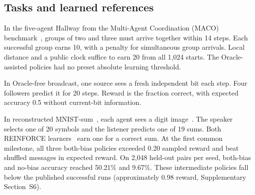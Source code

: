 \documentclass[pdflatex,sn-mathphys-num]{sn-jnl}
\begin{document}
\subsection{Tasks and learned references}\label{sec:tasks}
In the five-agent Hallway from the Multi-Agent Coordination (MACO) benchmark~\citep{wang2022casec}, groups of two and three must arrive together within 14 steps. Each successful group earns 10, with a penalty for simultaneous group arrivals. Local distance and a public clock suffice to earn 20 from all 1,024 starts. The Oracle-assisted policies had no preset absolute learning threshold.

In Oracle-free broadcast, one source sees a fresh independent bit each step. Four followers predict it for 20 steps. Reward is the fraction correct, with expected accuracy 0.5 without current-bit information.

In reconstructed MNIST-sum~\citep{eccles2019biases}, each agent sees a digit image~\citep{lecun1998gradient}. The speaker selects one of 20 symbols and the listener predicts one of 19 sums. Both REINFORCE learners~\citep{williams1992simple} earn one for a correct sum. At the first common milestone, all three both-bias policies exceeded 0.20 sampled reward and beat shuffled messages in expected reward. On 2,048 held-out pairs per seed, both-bias and no-bias accuracy reached 50.21\% and 9.67\%. These intermediate policies fall below the published successful runs (approximately 0.98 reward, Supplementary Section~S6).
\end{document}
